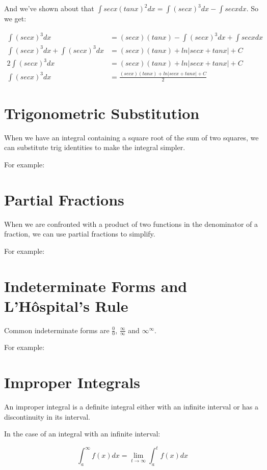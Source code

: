 \documentclass{article}
\begin{document}
And we've shown about that $\int secx (tanx)^2 dx = \int (secx)^3 dx -
\int secx dx$.  So we get:

\begin{align*}
  \int (secx)^3 dx &= (secx)(tanx) - \int (secx)^3 dx + \int secx dx \\
  \int (secx)^3 dx + \int (secx)^3 dx &=
  (secx)(tanx) + ln \left| secx + tanx \right| + C \\
  2 \int (secx)^3 dx &= (secx)(tanx) + ln \left| secx + tanx \right| + C \\
  \int (secx)^3 dx &= \frac{(secx)(tanx) + ln \left| secx + tanx \right| + C}{2}
\end{align*}

\section{Trigonometric Substitution}

When we have an integral containing a square root of the sum of two
squares, we can substitute trig identities to make the integral simpler.

For example:

\section{Partial Fractions}

When we are confronted with a product of two functions in the
denominator of a fraction, we can use partial fractions to simplify.

For example:

\section{Indeterminate Forms and L'H\^{o}spital's Rule}

Common indeterminate forms are $\frac{0}{0}$, $\frac{\infty}{\infty}$
and $\infty^\infty$.

For example:

\section{Improper Integrals}

An improper integral is a definite integral either with an infinite
interval or has a discontinuity in its interval.

In the case of an integral with an infinite interval:

\[
\int^\infty_a f(x)dx = \lim_{t \to \infty} \int^t_a f(x)dx
\]
\end{document}

